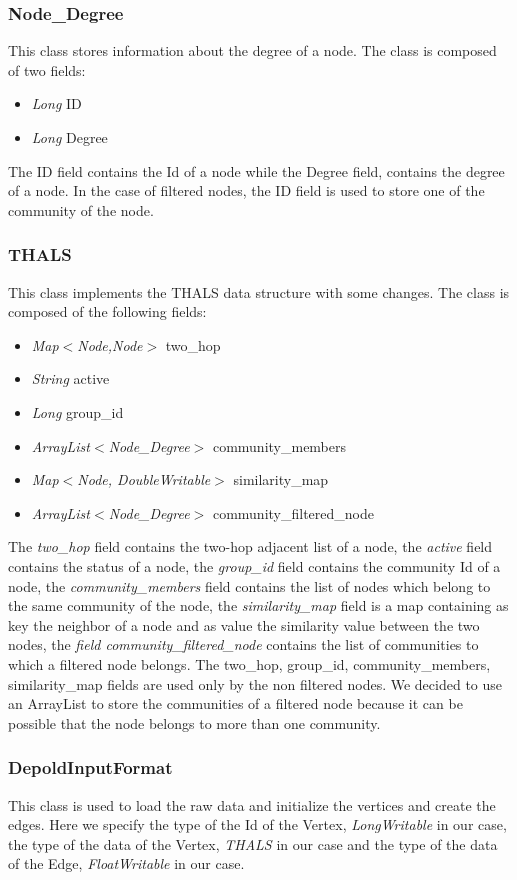 \documentclass[12pt]{article}
\begin{document}
\subsubsection{Node\_Degree}
This class stores information about the degree of a node.
The class is composed of two fields:
\begin{itemize}
    \item \emph{Long} ID
    \item \emph{Long} Degree
\end{itemize}
    The ID field contains the Id of a node while the Degree field, contains the degree of a node.
    In the case of filtered nodes, the ID field is used to store one of the community of the node.
\subsubsection{THALS}
This class implements the THALS data structure with some changes.
The class is composed of the following fields:
\begin{itemize}
    \item \emph{Map$<$Node,Node$>$} two\_hop
    \item \emph{String} active
    \item \emph{Long} group\_id
    \item \emph{ArrayList$<$Node\_Degree$>$} community\_members
    \item \emph{Map$<$Node, DoubleWritable$>$} similarity\_map
    \item \emph{ArrayList$<$Node\_Degree$>$} community\_filtered\_node
\end{itemize}
    The \emph{two\_hop} field contains the two-hop adjacent list of a node, the \emph{active} field contains the status of a node, the \emph{group\_id} field contains the community Id of a node, the \emph{community\_members} field contains the list of nodes which belong to the same community of the node, the \emph{similarity\_map} field is a map containing as key the neighbor of a node and as value the similarity value between the two nodes, the \emph{field community\_filtered\_node} contains the list of communities to which a filtered node belongs.
    The two\_hop, group\_id, community\_members, similarity\_map fields are used only by the non filtered nodes.
    We decided to use an ArrayList to store the communities of a filtered node because it can be possible that the node belongs to more than one community.
\subsubsection{DepoldInputFormat}
This class is used to load the raw data and initialize the vertices and create the edges.
Here we specify the type of the Id of the Vertex, \emph{LongWritable} in our case, the type of the data of the Vertex, \emph{THALS} in our case and the type of the data of the Edge, \emph{FloatWritable} in our case.
\end{document}
